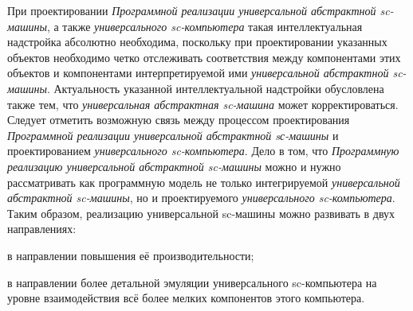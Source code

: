 \begin{scnsubstruct}
{    При проектировании \textit{Программной реализации универсальной абстрактной sc-машины}, а также \textit{универсального sc-компьютера} такая интеллектуальная надстройка абсолютно необходима, поскольку при проектировании указанных объектов необходимо четко отслеживать соответствия между компонентами этих объектов и компонентами интерпретируемой ими \textit{универсальной абстрактной sc-машины}. Актуальность указанной интеллектуальной надстройки обусловлена также тем, что \textit{универсальная абстрактная sc-машина} может корректироваться.\\
    Следует отметить возможную связь между процессом проектирования \textit{Программной реализации универсальной абстрактной sс-машины} и проектированием \textit{универсального sc-компьютера}. Дело в том, что \textit{Программную реализацию универсальной абстрактной sc-машины} можно и нужно рассматривать как программную модель не только интегрируемой \textit{универсальной абстрактной sc-машины}, но и проектируемого \textit{универсального sc-компьютера}. Таким образом, реализацию универсальной sc-машины можно развивать в двух направлениях:
        \begin{scnitemize}
            \item в направлении повышения её производительности;
            \item в направлении более детальной эмуляции универсального sc-компьютера на уровне взаимодействия всё более мелких компонентов этого компьютера.
        \end{scnitemize}}
    
    \bigskip
    

\end{scnsubstruct}
